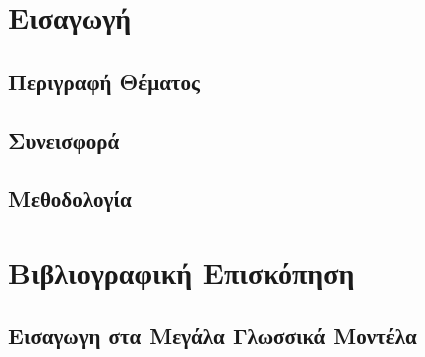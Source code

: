 \documentclass[11pt]{report}
\begin{document}



\setcounter{page}{0}



\tableofcontents
\newpage\phantom{~}\newpage



\setcounter{page}{0}    %

\chapter{Εισαγωγή}

\section{Περιγραφή Θέματος}


\section{Συνεισφορά}


\section{Μεθοδολογία}


\chapter{Βιβλιογραφική Επισκόπηση}

\section{Εισαγωγη στα Μεγάλα Γλωσσικά Μοντέλα}

\end{document}
